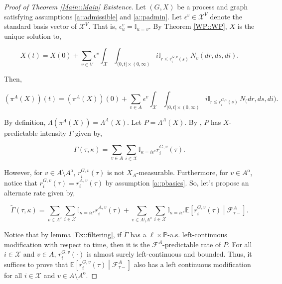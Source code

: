 \documentclass[12pt]{article}
\newcommand{\mb}{\mathbb}
\newcommand{\mc}{\mathcal}
\newcommand{\ep}{\epsilon}
\newcommand{\pr}{\mb{P}}							%
\newcommand{\ex}[1]{\mb{E}\left[#1\right]}			%
\newcommand{\sta}{\mc{X}}							%
\newcommand{\Xf}{X}									%
\newcommand{\poiss}{N}								%
\newcommand{\Sm}{\ell}								%
\newcommand{\rate}{r}								%
\newcommand{\F}{\mc{F}}								%
\newcommand{\proj}{\pi}								%
\newcommand{\poissv}[1]{_{#1}}						%
\newcommand{\vind}[1]{_{#1}}						%
\newcommand{\tme}[1]{(#1)}							%
\newcommand{\vpara}[1]{^{#1}}						%
\newcommand{\stpara}[1]{_{#1}}						%
\newcommand{\tpara}[1]{_{#1}}						%
\newcommand{\gvpara}[2]{^{#1,#2}}					%
\newcommand{\inte}[1]{{#1}^\mathrm{o}}				%
\newcommand{\alt}[1]{\tilde{#1}}					%
\newcommand{\pmap}{\Lambda}							%
\newcommand{\rt}{\tau}								%
\renewcommand{\mark}{\kappa}						%
\newcommand{\ratee}{\Gamma}							%
\newcommand{\rp}{P}									%
\newcommand{\ev}[1]{\ep^{#1}}						%
\begin{document}
\begin{proof}[Proof of Theorem \ref{Main::Main} Existence]

Let \((G,\Xf)\) be a process and graph satisfying assumptions \ref{a::admissible} and \ref{a::padmin}. Let \(\ev{v} \in \sta^V\) denote the standard basis vector of \(\sta^V\). That is, \(\ev{v}\vind{u} = \mb{I}_{u=v}\). By Theorem \ref{WP::WP}, \(\Xf\) is the unique solution to,

\[\Xf\tme{t} = \Xf\tme{0} + \sum_{v \in V}\ev{v}\int_\sta\int_{(0,t]\times (0,\infty)} i\mb{I}_{r \leq \rate\gvpara{G}{v}\stpara{i}\tme{s}}\,\poiss\poissv{v}(dr,ds,di).\]

Then,

\[\left(\proj\vpara{A}(\Xf)\right)\tme{t} = \left(\proj\vpara{A}(\Xf)\right)\tme{0} + \sum_{v\in A}\ev{v}\int_\sta\int_{(0,t]\times (0,\infty)} i\mb{I}_{r \leq \rate\gvpara{G}{v}\stpara{i}\tme{s}}\,\poiss\poissv(dr,ds,di).\]

By definition, \(\pmap\left(\proj\vpara{A}(\Xf)\right) = \pmap\vpara{A}(\Xf)\). Let \(\rp = \pmap\vpara{A}(\Xf)\). By \cite[Exercise 14.7.1]{DalVer08}, \(\rp\) has \(\Xf\)-predictable intensity \(\ratee\) given by,

\[\ratee(\rt,\mark) = \sum_{v \in A} \sum_{i \in \sta} \mb{I}_{\mark = i\ev{v}} \rate\gvpara{G}{v}\stpara{i}\tme{\rt}.\]

However, for \(v \in A\setminus \inte{A}\), \(\rate\gvpara{G}{v}\stpara{i}\tme{\rt}\) is not \(\Xf\vind{A}\)-measurable. Furthermore, for \(v \in \inte{A}\), notice that \(\rate\gvpara{G}{v}\stpara{i}\tme{\rt} = \rate\gvpara{A}{v}\stpara{i}\tme{\rt}\) by assumption \ref{a::pbasics}. So, let's propose an alternate rate given by,

\begin{equation}
\alt{\ratee}(\rt,\mark) = \sum_{v \in \inte{A}}\sum_{i\in \sta} \mb{I}_{\mark = i\ev{v}}\rate\gvpara{A}{v}\stpara{i}\tme{\rt} + \sum_{v \in A\setminus \inte{A}}\sum_{i \in \sta} \mb{I}_{\mark = i\ev{v}}\ex{\rate\gvpara{G}{v}\stpara{i}\tme{\rt}\middle|\F\vpara{A}\tpara{\rt-}}.
\label{Ex::tempfiltrate}
\end{equation}

Notice that by lemma \ref{Ex::filtering}, if \(\alt{\ratee}\) has a \(\Sm\times \pr\)-a.s. left-continuous modification with respect to time, then it is the \(\F\vpara{A}\)-predictable rate of \(\rp\). For all \(i\in\sta\) and \(v \in A\), \(\rate\gvpara{G}{v}\stpara{i}\tme{\cdot}\) is almost surely left-continuous and bounded. Thus, it suffices to prove that \(\ex{\rate\gvpara{G}{v}\stpara{i}(\rt)\middle|\F\vpara{A}\tpara{\rt-}}\) also has a left continuous modification for all \(i\in \sta\) and \(v \in A\setminus\inte{A}\).


\end{proof}
\end{document}
